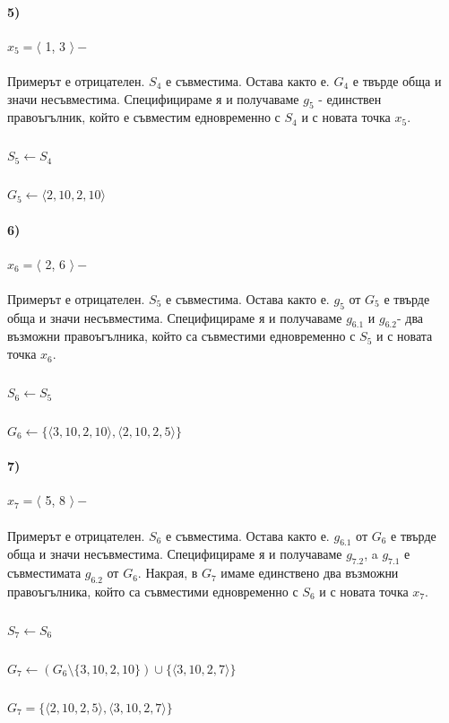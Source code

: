 \documentclass[12pt]{article}
\begin{document}
	\paragraph{5)} $x_{5} = \langle $ 1, 3 $\rangle  -$
	\paragraph{}
	Примерът е отрицателен. $S_{4}$ е съвместима. Остава както е. $G_{4}$ е твърде обща и значи несъвместима. Специфицираме я и получаваме $g_{5}$ - единствен правоъгълник, който е съвместим едновременно с $S_{4}$ и с новата точка $x_{5}$.
		\subparagraph{}
		$S_{5} \leftarrow S_{4}$
		\subparagraph{}
		$G_{5} \leftarrow \langle 2, 10, 2, 10 \rangle$
		
	\paragraph{6)} $x_{6} = \langle $ 2, 6 $\rangle  -$
	\paragraph{}
	Примерът е отрицателен. $S_{5}$ е съвместима. Остава както е. $g_{5}$ от $G_{5}$ е твърде обща и значи несъвместима. Специфицираме я и получаваме $g_{6.1}$ и $g_{6.2}$- два възможни правоъгълника, който са съвместими едновременно с $S_{5}$ и с новата точка $x_{6}$.
		\subparagraph{}
		$S_{6} \leftarrow S_{5}$
		\subparagraph{}
		$G_{6} \leftarrow \{ \langle 3, 10, 2, 10 \rangle,\langle 2, 10, 2, 5 \rangle \}$
		
	\paragraph{7)} $x_{7} = \langle $ 5, 8 $\rangle  -$
	\paragraph{}
	Примерът е отрицателен. $S_{6}$ е съвместима. Остава както е. $g_{6.1}$ от $G_{6}$ е твърде обща и значи несъвместима. Специфицираме я и получаваме $g_{7.2}$, a $g_{7.1}$ е съвместимата $g_{6.2}$ от $G_{6}$. Накрая, в $G_{7}$ имаме единствено два възможни правоъгълника, който са съвместими едновременно с $S_{6}$ и с новата точка $x_{7}$.
	\subparagraph{}
	$S_{7} \leftarrow S_{6}$
	\subparagraph{}
	$G_{7} \leftarrow (G_{6}\setminus\{3,10,2,10\}) \cup  \{ \langle 3, 10, 2, 7 \rangle \}$
	\subparagraph{}
	$G_{7} = \{ \langle 2, 10, 2, 5 \rangle,\langle 3, 10, 2, 7 \rangle \}$
	
\end{document}
